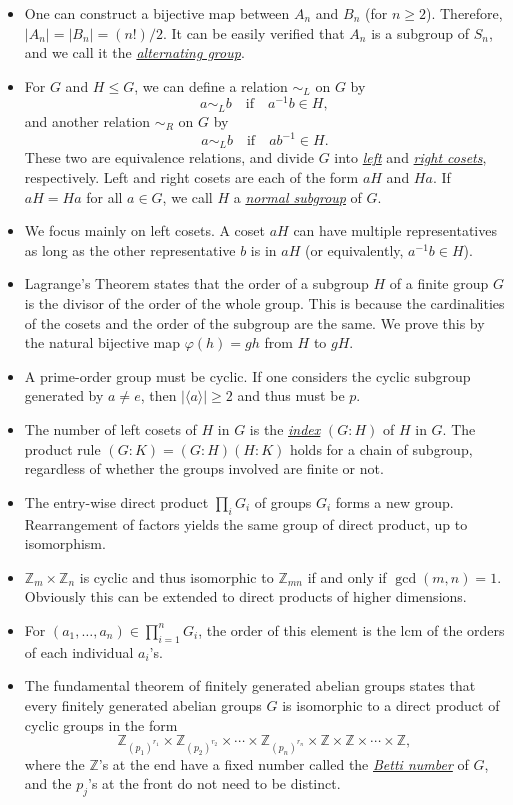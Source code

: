 \documentclass{article}
\newcommand{\df}[1]{\ul{\textit{#1}}}
\newcommand{\Z}{\mathbb{Z}}
\newcommand{\ga}{\langle a \rangle}
\renewcommand{\phi}{\varphi}
\begin{document}
\begin{itemize}
    \item One can construct a bijective map between $A_n$ and $B_n$ (for $n \geq 2$). Therefore, $|A_n| = |B_n| = (n!)/2$. It can be easily verified that $A_n$ is a subgroup of $S_n$, and we call it the \df{alternating group}.
    \item For $G$ and $H \leq G$, we can define a relation $\sim_L$ on $G$ by $$a \sim_L b \quad \text{if} \quad a^{-1}b \in H,$$ and another relation $\sim_R$ on $G$ by $$a \sim_L b \quad \text{if} \quad ab^{-1} \in H.$$ These two are equivalence relations, and divide $G$ into \df{left} and \df{right cosets}, respectively. Left and right cosets are each of the form $aH$ and $Ha$. If $aH = Ha$ for all $a \in G$, we call $H$ a \df{normal subgroup} of $G$.
    \item We focus mainly on left cosets. A coset $aH$ can have multiple representatives as long as the other representative $b$ is in $aH$ (or equivalently, $a^{-1}b \in H$).
    \item Lagrange's Theorem states that the order of a subgroup $H$ of a finite group $G$ is the divisor of the order of the whole group. This is because the cardinalities of the cosets and the order of the subgroup are the same. We prove this by the natural bijective map $\phi(h) = gh$ from $H$ to $gH$.
    \item A prime-order group must be cyclic. If one considers the cyclic subgroup generated by $a \not= e$, then $|\ga| \geq 2$ and thus must be $p$.
    \item The number of left cosets of $H$ in $G$ is the \df{index} $(G:H)$ of $H$ in $G$. The product rule $(G:K) = (G:H)(H:K)$ holds for a chain of subgroup, regardless of whether the groups involved are finite or not.
    \item The entry-wise direct product $\prod_{i} G_i$ of groups $G_i$ forms a new group. Rearrangement of factors yields the same group of direct product, up to isomorphism.
    \item $\Z_m \times \Z_n$ is cyclic and thus isomorphic to $\Z_{mn}$ if and only if $\gcd(m,n) = 1$. Obviously this can be extended to direct products of higher dimensions.
    \item For $(a_1, \dots, a_n) \in \prod_{i=1}^n G_i$, the order of this element is the lcm of the orders of each individual $a_i$'s.
    \item The fundamental theorem of finitely generated abelian groups states that every finitely generated abelian groups $G$ is isomorphic to a direct product of cyclic groups in the form $$\Z_{(p_1)^{r_1}} \times \Z_{(p_2)^{r_2}} \times \cdots \times \Z_{(p_n)^{r_n}} \times \Z \times \Z \times \cdots \times \Z,$$ where the $\Z$'s at the end have a fixed number called the \df{Betti number} of $G$, and the $p_j$'s at the front do not need to be distinct.

\end{itemize}
\end{document}
